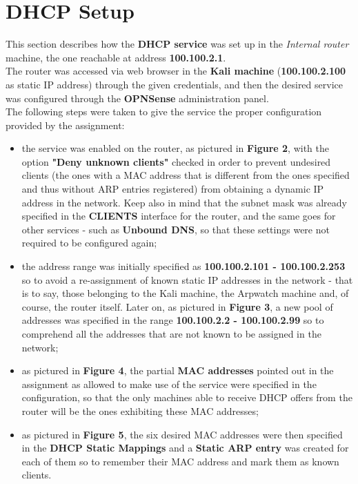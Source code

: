 \section{DHCP Setup}
This section describes how the \textbf{DHCP service} was set up in the \textit{Internal router} machine, the one reachable at address \textbf{100.100.2.1}.\\
The router was accessed via web browser in the \textbf{Kali machine} (\textbf{100.100.2.100} as static IP address) through the given credentials, and then the desired service was configured through the \textbf{OPNSense} administration panel.\\
The following steps were taken to give the service the proper configuration provided by the assignment:\\

\begin{itemize}
\item the service was enabled on the router, as pictured in \textbf{Figure 2}, with the option \textbf{"Deny unknown clients"} checked in order to prevent undesired clients (the ones with a MAC address that is different from the ones specified and thus without ARP entries registered) from obtaining a dynamic IP address in the network. Keep also in mind that the subnet mask was already specified in the \textbf{CLIENTS} interface for the router, and the same goes for other services - such as \textbf{Unbound DNS}, so that these settings were not required to be configured again;
\item the address range was initially specified as \textbf{100.100.2.101 - 100.100.2.253} so to avoid a re-assignment of known static IP addresses in the network - that is to say, those belonging to the Kali machine, the Arpwatch machine and, of course, the router itself. Later on, as pictured in \textbf{Figure 3}, a new pool of addresses was specified in the range \textbf{100.100.2.2 - 100.100.2.99} so to comprehend all the addresses that are not known to be assigned in the network;
\item as pictured in \textbf{Figure 4}, the partial \textbf{MAC addresses} pointed out in the assignment as allowed to make use of the service were specified in the configuration, so that the only machines able to receive DHCP offers from the router will be the ones exhibiting these MAC addresses;
\item as pictured in \textbf{Figure 5}, the six desired MAC addresses were then specified in the \textbf{DHCP Static Mappings} and a \textbf{Static ARP entry} was created for each of them so to remember their MAC address and mark them as known clients.
\end{itemize}

